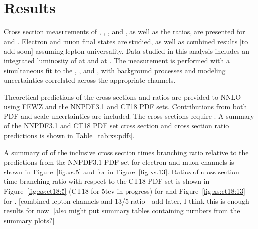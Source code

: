 \chapter{Results}
Cross section measurements of \Wp, \Wm, \W, and \Z, as well as the ratios, are presented for \serag and \serah. Electron and muon final states are studied, as well as combined results [to add soon] assuming lepton universality. Data studied in this analysis includes an integrated luminosity of \lumig at \serag and \lumih at \serah. The measurement is performed with a simultaneous fit to the \Wp, \Wm, and \Z, with background processes and modeling uncertainties correlated across the appropriate channels. 

Theoretical predictions of the cross sections and ratios are provided to NNLO using FEWZ and the NNPDF3.1 and CT18 PDF sets. Contributions from both PDF and scale uncertainties are included. The \Z cross sections require \masswindow. A summary of the NNPDF3.1 and CT18 PDF set cross section and cross section ratio predictions is shown in Table~\ref{tab:xs:pdfs}.



A summary of of the inclusive cross section times branching ratio relative to the predictions from the NNPDF3.1 PDF set for \serag electron and muon channels is shown in Figure~\ref{fig:xs:5} and for \serah in Figure~\ref{fig:xs:13}. Ratios of cross section time branching ratio with respect to the CT18 PDF set is shown in Figure~\ref{fig:xs:ct18:5} (CT18 for 5tev in progress) for \serag and Figure~\ref{fig:xs:ct18:13} for \serah.
[combined lepton channels and 13/5 ratio - add later, I think this is enough results for now]
[also might put summary tables containing numbers from the summary plots?]

% 
% 






